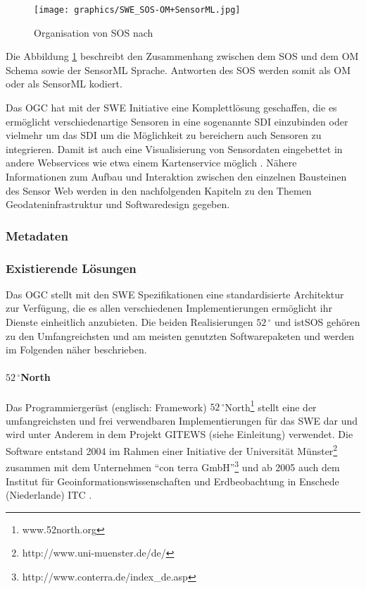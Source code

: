 \citep{botts_ogc_2008}\citep{woolf_gigas_2008}\citep{kunkel_teodoor:_2012}\citep{walkowski_sensor_2008}

\begin{figure}[H]
	\centering
 	 \texttt{[image: graphics/SWE\_SOS-OM+SensorML.jpg]} 
	\caption{Organisation von SOS nach \citep{ansorge_web_2012}}
	 \label{fig:swe_sos-om+sml}
\end{figure}

Die Abbildung \ref{fig:swe_sos-om+sml} beschreibt den Zusammenhang zwischen dem \gls{SOS} und dem \gls{OM} Schema sowie der \gls{SensorML} Sprache. Antworten des \gls{SOS} werden somit als \gls{OM} oder als \gls{SensorML} kodiert.

Das \gls{OGC} hat mit der \gls{SWE} Initiative eine Komplettlösung geschaffen, die es ermöglicht verschiedenartige Sensoren in eine sogenannte  \gls{SDI} einzubinden oder vielmehr um das \gls{SDI} um die Möglichkeit zu bereichern auch Sensoren zu integrieren. Damit ist auch eine Visualisierung von Sensordaten eingebettet in andere Webservices wie etwa einem Kartenservice möglich \citep{broring_new_2011}\citep{walkowski_sensor_2008}. Nähere Informationen zum Aufbau und Interaktion zwischen den einzelnen Bausteinen des Sensor Web werden in den nachfolgenden Kapiteln zu den Themen Geodateninfrastruktur und Softwaredesign gegeben.

\subsubsection{Metadaten}

\subsubsection{Existierende Lösungen}
Das \gls{OGC} stellt mit den \gls{SWE} Spezifikationen eine standardisierte Architektur zur Verfügung, die es allen verschiedenen Implementierungen ermöglicht ihr Dienste einheitlich anzubieten. Die beiden Realisierungen $52\,^{\circ}$ und istSOS gehören zu den Umfangreichsten und am meisten genutzten Softwarepaketen und werden im Folgenden näher beschrieben.

\paragraph{$52\,^{\circ}$North}
Das Programmiergerüst (englisch: Framework) $52\,^{\circ}$North\footnote{www.52north.org} stellt eine der umfangreichsten und frei verwendbaren Implementierungen für das \gls{SWE} dar und wird unter Anderem in dem Projekt \gls{GITEWS} (siehe Einleitung) verwendet. Die Software entstand 2004 im Rahmen einer Initiative der Universität Münster\footnote{http://www.uni-muenster.de/de/} zusammen mit dem Unternehmen ``con terra GmbH''\footnote{http://www.conterra.de/index\_de.asp} und ab 2005 auch dem Institut für Geoinformationswissenschaften und Erdbeobachtung in Enschede (Niederlande) \gls{ITC} \citep{botts_ogc_2008}\citep{kraak_what_2005}. 

